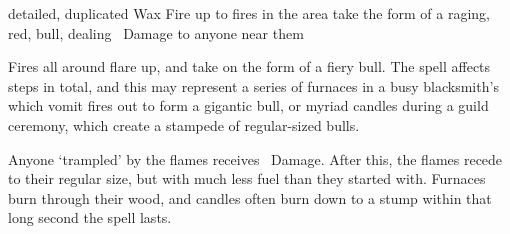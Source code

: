   {detailed, duplicated}%
  {Wax}%
  {Fire}%
  {}%
  {up to  fires in the area take the form of a raging, red, bull, dealing \showDam\ Damage to anyone near them}%
  {
    Fires all around flare up, and take on the form of a fiery bull.
    The spell affects  steps in total, and this may represent a series of furnaces in a busy blacksmith's which vomit fires out to form a gigantic bull, or myriad candles during a guild ceremony, which create a stampede of regular-sized bulls.

  Anyone `trampled' by the flames receives \showDam\ Damage.
  After this, the flames recede to their regular size, but with much less fuel than they started with.
  Furnaces burn through their wood, and candles often burn down to a stump within that long second the spell lasts.
  }

